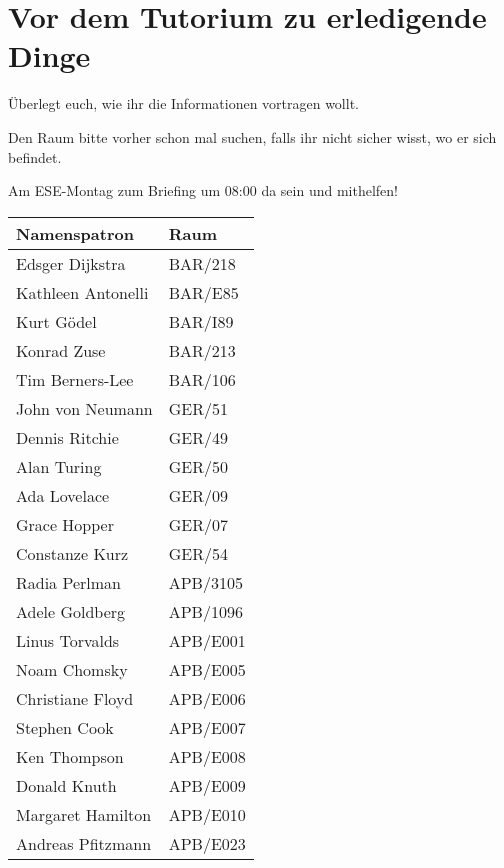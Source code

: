 \documentclass[a4paper,12pt]{report}
\begin{document}
\section{Vor dem Tutorium zu erledigende Dinge}
\begin{itemize*}
\item Überlegt euch, wie ihr die Informationen vortragen wollt.
\item Den Raum bitte vorher schon mal suchen, falls ihr nicht sicher wisst, wo er sich befindet.
\item Am ESE-Montag zum Briefing um 08:00 da sein und mithelfen!
\end{itemize*}
\label{tabelle}
\begin{center}
\vspace{1cm}
\begin{tabular}[h]{|l|l|}
	\hline
	\textbf{Namenspatron}		& \textbf{Raum}\\ \hline
	Edsger Dijkstra				& BAR/218\\
	Kathleen Antonelli			& BAR/E85\\
	Kurt Gödel					& BAR/I89\\
	Konrad Zuse					& BAR/213\\
	Tim Berners-Lee				& BAR/106\\
	John von Neumann			& GER/51\\
	Dennis Ritchie				& GER/49\\
	Alan Turing 				& GER/50\\
	Ada Lovelace				& GER/09\\
	Grace Hopper				& GER/07\\
	Constanze Kurz				& GER/54\\
	Radia Perlman               & APB/3105\\
	Adele Goldberg				& APB/1096\\
	Linus Torvalds				& APB/E001\\
	Noam Chomsky				& APB/E005\\
	Christiane Floyd			& APB/E006\\
	Stephen Cook				& APB/E007\\
	Ken Thompson				& APB/E008\\
	Donald Knuth				& APB/E009\\
	Margaret Hamilton			& APB/E010\\
	Andreas Pfitzmann			& APB/E023\\
	\hline
\end{tabular}
\end{center}
\end{document}
